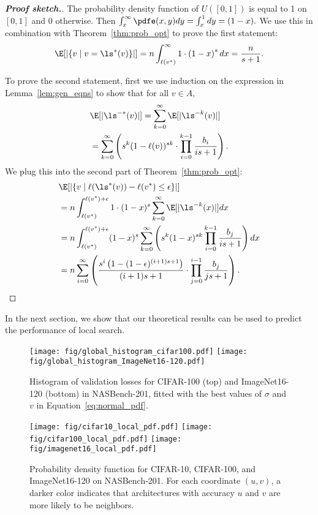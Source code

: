 \begin{proof}[\textbf{Proof sketch.}]
The probability density function of $U([0,1])$ is equal to 1 on $[0,1]$ and 0 otherwise.
Then $\int_{x}^\infty \pdfe(x,y)dy=\int_{x}^1 dy=(1-x).$
We use this in combination with Theorem~\ref{thm:prob_opt} to prove the first statement:
\begin{equation*}
\E[|\{v\mid v=\ls^*(v)\}|]
=n\int_{\ell(v^*)}^\infty 1\cdot 
\left(1-x\right)^s dx=\frac{n}{s+1}.
\end{equation*}

To prove the second statement, first
we use induction on the expression in Lemma~\ref{lem:gen_eqns}
to show that for all $v\in A$, 
\begin{align*}
&\E[|\ls^{-*}(v)|]=\sum_{k=0}^\infty \E[|\ls^{-k}(v)|]\\
&=\sum_{k=0}^\infty \left(s^k (1-\ell(v))^{sk} 
\cdot\prod_{i=0}^{k-1}\frac{b_i}{is+1}\right).
\end{align*}
We plug this into the second part of Theorem~\ref{thm:prob_opt}:
\begin{align*}
&\E[|\{v\mid \ell(\ls^*(v))-\ell(v^*)\leq\epsilon\}|]\\
&=n \int_{\ell(v^*)}^{\ell(v^*)+\epsilon}
1\cdot (1-x)^s \sum_{k=0}^\infty \E[|\ls^{-k}(x)|]dx\\
&=n \int_{\ell(v^*)}^{\ell(v^*)+\epsilon}
(1-x)^s \sum_{k=0}^\infty \left(s^k(1-x)^{sk} \prod_{i=0}^{k-1}\frac{b_j}{is+1}\right)dx\\
&=n \sum_{i=0}^\infty\left(\frac{s^i\left(1-(1-\epsilon)^{(i+1)s+1}\right)}{(i+1)s+1}
\cdot\prod_{j=0}^{i-1}\frac{b_j}{js+1}\right).
\end{align*}
\end{proof}

In the next section, we show that our theoretical results can be used to
predict the performance of local search.




\begin{figure}
\centering \texttt{[image: fig/global\_histogram\_cifar100.pdf]}
\texttt{[image: fig/global\_histogram\_ImageNet16-120.pdf]}
\caption{
Histogram of validation losses for CIFAR-100 (top) and ImageNet16-120 (bottom) 
in NASBench-201,
fitted with the best values of $\sigma$ and $v$ in Equation~\ref{eq:normal_pdf}.
}
\label{fig:single_histogram}
\end{figure}

\begin{figure*}
\centering \texttt{[image: fig/cifar10\_local\_pdf.pdf]}
\texttt{[image: fig/cifar100\_local\_pdf.pdf]}
\texttt{[image: fig/imagenet16\_local\_pdf.pdf]}
\caption{
Probability density function for CIFAR-10, CIFAR-100, and
ImageNet16-120 on NASBench-201. For each coordinate $(u,v)$, a darker color indicates
that architectures with accuracy $u$ and $v$ are more likely to be neighbors.
}
\label{fig:201_local_pdfs}
\end{figure*}


